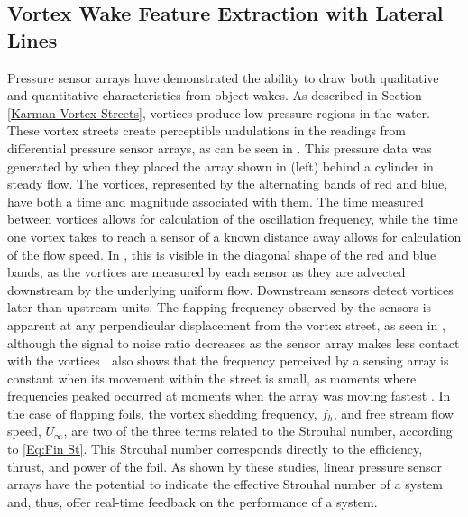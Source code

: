 \subsection{Vortex Wake Feature Extraction with Lateral Lines} \label{Vortex Wake Feature Extraction with Lateral Lines}

    Pressure sensor arrays have demonstrated the ability to draw both qualitative and quantitative characteristics from object wakes. As described in Section \ref{Karman Vortex Streets}, vortices produce low pressure regions in the water. These vortex streets create perceptible undulations in the readings from differential pressure sensor arrays, as can be seen in . This pressure data was generated by \citep{Venturelli2012} when they placed the array shown in (left) behind a cylinder in steady flow. The vortices, represented by the alternating bands of red and blue, have both a time and magnitude associated with them. The time measured between vortices allows for calculation of the oscillation frequency, while the time one vortex takes to reach a sensor of a known distance away allows for calculation of the flow speed. In , this is visible in the diagonal shape of the red and blue bands, as the vortices are measured by each sensor as they are advected downstream by the underlying uniform flow. Downstream sensors detect vortices later than upstream units. The flapping frequency observed by the sensors is apparent at any perpendicular displacement from the vortex street, as seen in , although the signal to noise ratio decreases as the sensor array makes less contact with the vortices \citep{Chambers2014}.  also shows that the frequency perceived by a sensing array is constant when its movement within the street is small, as moments where frequencies peaked occurred at moments when the array was moving fastest \citep{Chambers2014}.  In the case of flapping foils, the vortex shedding frequency, \(f_h\), and free stream flow speed, \(U_\infty\), are two of the three terms related to the Strouhal number, according to \ref{Eq:Fin St}. This Strouhal number corresponds directly to the efficiency, thrust, and power of the foil. As shown by these studies, linear pressure sensor arrays have the potential to indicate the effective Strouhal number of a system and, thus, offer real-time feedback on the performance of a system. 
    

